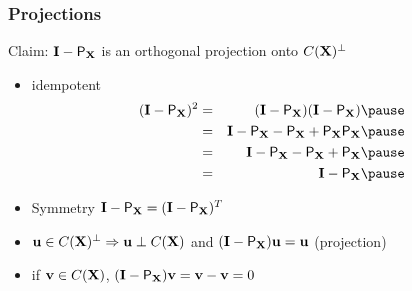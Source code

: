 \documentclass{beamer}
\begin{document}
\begin{frame} \frametitle{Projections}
  Claim: $\mathbf{I} - \textsf{P}_{\mathbf{X}}$ is an orthogonal projection onto $C(\mathbf{X})^{\perp}$ \pause
  \begin{itemize}
  \item idempotent  \pause
    \begin{eqnarray*}
(\I - \P_{\X})^2 &= & (\I - \P_\X)(\I - \P_\X)  \pause \\
& = & \I - \P_\X - \P_\X + \P_\X \P_\X       \pause \\
& = & \I - \P_\X -\P_\X + \P_\X  \pause\\
& = & \I - \P_\X  \pause
    \end{eqnarray*}
\item Symmetry $\mathbf{I} - \textsf{P}_{\mathbf{X}} = (\mathbf{I} - \textsf{P}_{\mathbf{X}})^T$  \pause
\item $\mathbf{u} \in C(\mathbf{X})^{\perp} \Rightarrow \mathbf{u} \perp C(\mathbf{X})$ and  $(\mathbf{I}
  -\textsf{P}_{\mathbf{X}}) \mathbf{u}  = \mathbf{u}$  (projection)  \pause
\item if $\mathbf{v} \in C(\mathbf{X})$, $(\mathbf{I} - \textsf{P}_{\mathbf{X}} ) \mathbf{v} = \mathbf{v} - \mathbf{v} = 0$ 
  \end{itemize}
\end{frame}
\end{document}
